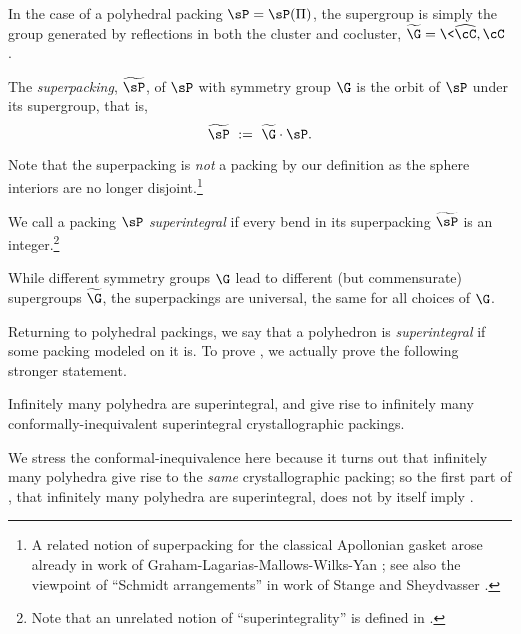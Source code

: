 \documentclass[12pt,reqno]{amsart}
\begin{document}
In the case of a polyhedral packing $\sP=\sP(\Pi)$, the supergroup is simply the group generated by reflections in both the cluster and cocluster, $\widetilde\G=\<\widehat\cC,\cC\>$.

\begin{Def}
The {\it superpacking}, $\widetilde \sP$, of $\sP$ with symmetry group $\G$
is the orbit of $\sP$ under its supergroup, that is,
$$
\widetilde \sP \ :  = \ \widetilde\G\cdot\sP.
$$
\end{Def}

Note that the superpacking is {\it not} a packing by our definition as the sphere interiors are no longer disjoint.\footnote{A related notion of superpacking for the classical Apollonian gasket arose already in work of Graham-Lagarias-Mallows-Wilks-Yan \cite{GLMWYII}; see also the viewpoint of ``Schmidt arrangements'' in work of Stange \cite{Stange2015} and Sheydvasser \cite{Sheydvasser2017}.}

\begin{Def}
We call a %
packing $\sP$ {\it superintegral} if every bend in its superpacking $\widetilde\sP$ is 
an integer.\footnote{Note that 
an unrelated notion of ``superintegrality'' is defined
in \cite[\S8]{GLMWYII}.}
\end{Def}

\begin{rmk}
While different symmetry groups $\G$ lead to different (but commensurate) supergroups $\widetilde\G$, the superpackings are universal, the same for all choices of $\G$.
\end{rmk}

Returning to polyhedral packings, we say that a polyhedron is {\it  superintegral} if some packing modeled on it is.
To prove , we actually prove the following stronger statement.

\begin{thm}\label{thm:infSuper}
Infinitely many polyhedra are superintegral, and give rise to infinitely many conformally-inequivalent superintegral crystallographic packings.
\end{thm}

\begin{rmk}
We stress the conformal-inequivalence here because it turns out that infinitely many polyhedra give rise to the {\it same} crystallographic packing; so the
first part of , that infinitely many polyhedra are superintegral, does not by itself imply .
\end{rmk}
\end{document}
